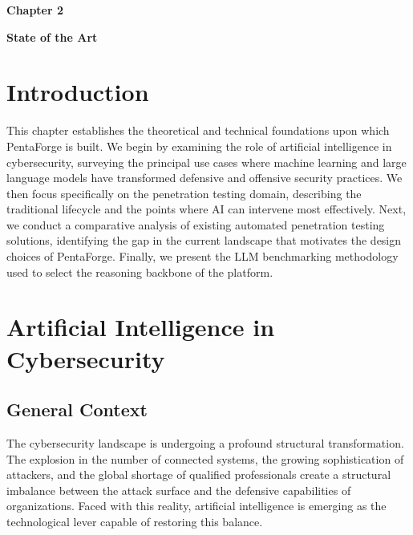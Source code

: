 \documentclass[12pt,a4paper]{report}
\begin{document}
{\fontsize{26}{30}\selectfont \textbf{Chapter 2}}\par

\vspace{1cm}

{\LARGE\bfseries State of the Art}

\vspace{0.8cm}

\setcounter{chapter}{2}
\setcounter{section}{0}

\section*{Introduction}

This chapter establishes the theoretical and technical foundations upon which
PentaForge is built. We begin by examining the role of artificial intelligence
in cybersecurity, surveying the principal use cases where machine learning and
large language models have transformed defensive and offensive security practices.
We then focus specifically on the penetration testing domain, describing the
traditional lifecycle and the points where AI can intervene most effectively.
Next, we conduct a comparative analysis of existing automated penetration
testing solutions, identifying the gap in the current landscape that motivates
the design choices of PentaForge. Finally, we present the LLM benchmarking
methodology used to select the reasoning backbone of the platform.

\section{Artificial Intelligence in Cybersecurity}

\subsection{General Context}

The cybersecurity landscape is undergoing a profound structural transformation.
The explosion in the number of connected systems, the growing sophistication of
attackers, and the global shortage of qualified professionals create a structural
imbalance between the attack surface and the defensive capabilities of organizations.
Faced with this reality, artificial intelligence is emerging as the technological
lever capable of restoring this balance.
\end{document}
